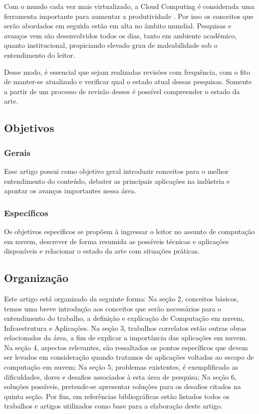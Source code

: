 \documentclass[12pt]{article}
\begin{document}
Com o mundo cada vez mais virtualizado, a Cloud Computing é considerada uma ferramenta importante para aumentar a produtividade \cite{loos}. Por isso os conceitos que serão abordados em seguida estão em alta no âmbito mundial. Pesquisas e avanços vem são desenvolvidos todos os dias, tanto em ambiente acadêmico, quanto institucional, propiciando elevado grau de maleabilidade sob o entendimento do leitor.

Desse modo, é essencial que sejam realizadas revisões com frequência, com o fito de manter-se atualizado e verificar qual o estado atual dessas pesquisas. Somente a partir de um processo de revisão desses é possível compreender o estado da arte.

\subsection{Objetivos}

\subsubsection{Gerais}
Esse artigo possui como objetivo geral introduzir conceitos para o melhor entendimento do conteúdo, debater as principais aplicações na indústria e apontar os avanços importantes nessa área.

\subsubsection{Específicos}
Os objetivos específicos se propõem à ingressar o leitor no assunto de computação em nuvem, descrever de forma resumida as possíveis técnicas e aplicações disponíveis e relacionar o estado da arte com situações práticas.

\subsection{Organização}

Este artigo está organizado da seguinte forma:
Na seção 2, conceitos básicos, temos uma breve introdução aos conceitos que serão necessários para o entendimento do trabalho, a definição e explicação de Computação em nuvem, Infraestrutura e Aplicações. Na seção 3, trabalhos correlatos estão outras obras relacionadas da área, a fim de explicar a importância das aplicações em nuvem. Na seção 4, aspectos relevantes, são ressaltados os pontos específicos que devem ser levados em consideração quando tratamos de aplicações voltadas ao escopo de computação em nuvem; Na seção 5, problemas existentes, é exemplificado as dificuldades, dores e desafios associados à esta área de pesquisa; Na seção 6, soluções possíveis, pretende-se apresentar soluções para os desafios citados na quinta seção. Por fim, em referências bibliográficas estão listados todos os trabalhos e artigos utilizados como base para a elaboração deste artigo.
\end{document}
